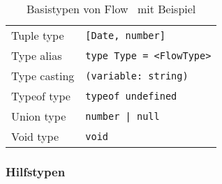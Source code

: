 \begin{table}
\begin{tabularx}{\textwidth}{@{}ll@{}}
    Tuple type                 & \texttt{{[}Date, number{]}}              \\
    Type alias                 & \texttt{type Type = <{}FlowType>{}}      \\
    Type casting               & \texttt{(variable: string)}              \\
    Typeof type                & \texttt{typeof undefined}                \\
    Union type                 & \texttt{number | null}                   \\
    Void type                  & \texttt{void}                            \\
    \midrule
  \end{tabularx}
  \caption{Basistypen von Flow~\autocite{FLOW_TYPE_ANNOTATIONS} mit Beispiel}
  \label{tab:flow-base-types}
\end{table}

\subsubsection{Hilfstypen}

